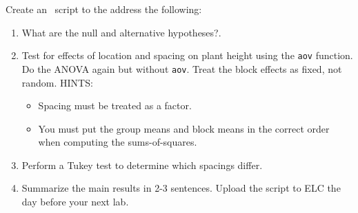 \documentclass[color=usenames,dvipsnames]{beamer}\usepackage[]{graphicx}\usepackage[]{color}
\newcommand{\inr}[1]{\colorbox{inlinecolor}{\texttt{#1}}}
\begin{document}
\begin{frame}
    Create an \R~script to the address the following:
    \begin{enumerate}[(1)]
      \item What are the null and alternative hypotheses?.
      \item Test for effects of location and spacing on plant height
        using the \inr{aov} function. Do the ANOVA again but without
        \inr{aov}. Treat the block effects as fixed, not random. HINTS:
        \begin{itemize}
          \tiny
          \item Spacing must be treated as a factor.
          \item You must put the group means and block means in the
            correct order when computing the sums-of-squares.
        \end{itemize}
      \item Perform a Tukey test to determine which spacings differ.
      \item Summarize the main results in 2-3 sentences. Upload the
        script to ELC the day before your next lab.
    \end{enumerate}

\end{frame}
\end{document}
